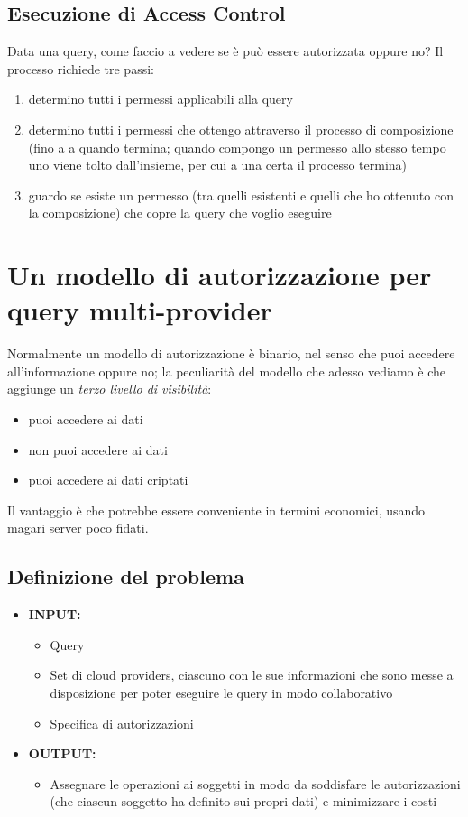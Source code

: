 \documentclass{report}
\begin{document}
\section{Esecuzione di Access Control}
Data una query, come faccio a vedere se è può essere autorizzata oppure no? Il processo richiede tre passi:
\begin{enumerate}
    \item determino tutti i permessi applicabili alla query 
    \item determino tutti i permessi che ottengo attraverso il processo di composizione (fino a a quando termina; quando compongo un permesso allo 
    stesso tempo uno viene tolto dall'insieme, per cui a una certa il processo termina)
    \item guardo se esiste un permesso (tra quelli esistenti e quelli che ho ottenuto con la composizione) che copre la query che voglio eseguire 
\end{enumerate}


\chapter{Un modello di autorizzazione per query multi-provider}

Normalmente un modello di autorizzazione è binario, nel senso che puoi accedere all'informazione oppure no; la peculiarità del modello 
che adesso vediamo è che aggiunge un \textit{terzo livello di visibilità}:
\begin{itemize}
    \item puoi accedere ai dati
    \item non puoi accedere ai dati
    \item puoi accedere ai dati criptati 
\end{itemize}

\noindent Il vantaggio è che potrebbe essere conveniente in termini economici, usando magari server poco fidati.

\section{Definizione del problema}

\begin{itemize}
    \item \textbf{INPUT:}
    \begin{itemize}
        \item Query 
        \item Set di cloud providers, ciascuno con le sue informazioni che sono messe a disposizione per poter eseguire le query in modo collaborativo
        \item Specifica di autorizzazioni 
    \end{itemize}
    \item \textbf{OUTPUT:}
    \begin{itemize}
        \item Assegnare le operazioni ai soggetti in modo da soddisfare le autorizzazioni (che ciascun soggetto ha definito sui propri dati) e minimizzare i costi
    \end{itemize}
\end{itemize}
\end{document}
